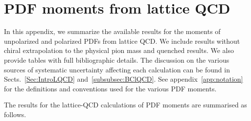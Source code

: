 \section{PDF moments from lattice QCD}
\label{sec:LQCDtables}

In this appendix, we summarize the available results for the moments of 
unpolarized and polarized PDFs from lattice QCD.
%
We include results without chiral extrapolation to the physical pion mass 
and quenched results. 
%
We also provide tables with full bibliographic details.
%
The discussion on the various sources of systematic uncertainty affecting
each calculation can be found in Sects.~\ref{Sec:IntroLQCD} 
and~\ref{subsubsec:BClQCD}.
%
See appendix~\ref{app:notation} for the definitions and conventions used
for the various PDF moments.

The results for the lattice-QCD calculations of PDF moments are summarised
as follows.
